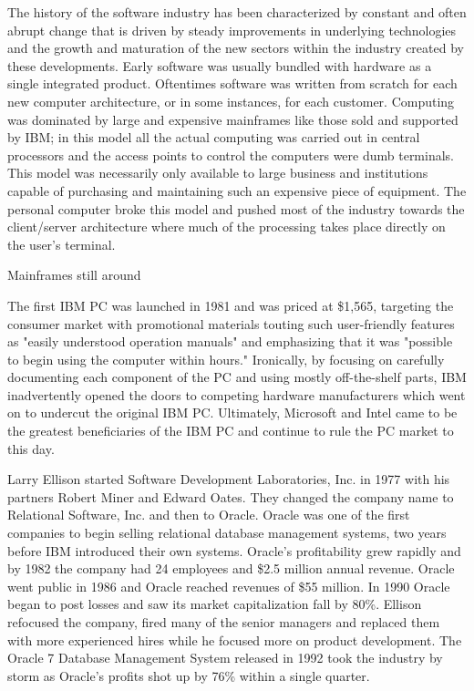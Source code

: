 The history of the software industry has been characterized by constant and often abrupt change that is driven by steady improvements in underlying technologies and the growth and maturation of the new sectors within the industry created by these developments. Early software was usually bundled with hardware as a single integrated product.\autocite[4]{buxmann2012software}
Oftentimes software was written from scratch for each new computer architecture, or in some instances, for each customer.\autocite{MainframesStillAround}
Computing was dominated by large and expensive mainframes like those sold and supported by IBM; in this model all the actual computing was carried out in central processors and the access points to control the computers were dumb terminals.\autocite[]{LargeParadigmShiftCloudComputing}
This model was necessarily only available to large business and institutions capable of purchasing and maintaining such an expensive piece of equipment.
The personal computer broke this model and pushed most of the industry towards the client/server architecture where much of the processing takes place directly on the user's terminal.\autocite[]{LargeParadigmShiftCloudComputing}



Mainframes still around\autocite{MainframesStillAround}

The first IBM PC was launched in 1981 and was priced at \$1,565, targeting the consumer market with promotional materials touting such user-friendly features as "easily understood operation manuals" and emphasizing that it was "possible to begin using the computer within hours."\autocite{PCBirthday}
Ironically, by focusing on carefully documenting each component of the PC and using mostly off-the-shelf parts, IBM inadvertently opened the doors to competing hardware manufacturers which went on to undercut the original IBM PC.\autocite{PCBirthday}
Ultimately, Microsoft and Intel came to be the greatest beneficiaries of the IBM PC and continue to rule the PC market to this day.\autocite{PCBirthday}

Larry Ellison started Software Development Laboratories, Inc. in 1977 with his partners Robert Miner and Edward Oates.\autocite[113]{finkle2012larry}
They changed the company name to Relational Software, Inc. and then to Oracle.\autocite[113]{finkle2012larry}
Oracle was one of the first companies to begin selling relational database management systems, two years before IBM introduced their own systems.\autocite[113]{finkle2012larry}
Oracle's profitability grew rapidly and by 1982 the company had 24 employees and \$2.5 million annual revenue.\autocite[113]{finkle2012larry}
Oracle went public in 1986 and Oracle reached revenues of \$55 million.\autocite[113]{finkle2012larry}
In 1990 Oracle began to post losses and saw its market capitalization fall by 80\%.\autocite[113]{finkle2012larry}
Ellison refocused the company, fired many of the senior managers and replaced them with more experienced hires while he focused more on product development.\autocite[113]{finkle2012larry}
The Oracle 7 Database Management System released in 1992 took the industry by storm as Oracle's profits shot up by 76\% within a single quarter.\autocite[114]{finkle2012larry}

